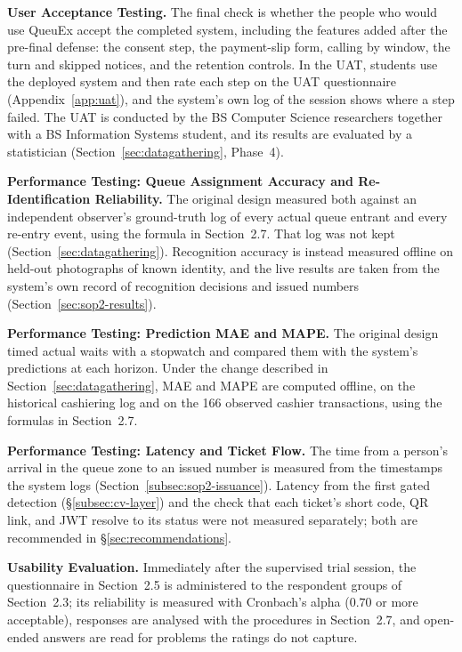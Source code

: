 \documentclass{research}
\newcommand{\sysname}{QueuEx}
\begin{document}
\textbf{User Acceptance Testing.} The final check is whether the people
who would use \sysname{} accept the completed system, including the
features added after the pre-final defense: the consent step, the
payment-slip form, calling by window, the turn and skipped notices, and
the retention controls. In the UAT, students use the deployed system
and then rate each step on the UAT questionnaire
(Appendix~\ref{app:uat}), and the system's own log of the session shows
where a step failed. The UAT is conducted by the BS Computer
Science researchers together with a BS Information Systems student, and
its results are evaluated by a
statistician (Section~\ref{sec:datagathering}, Phase~4).

\textbf{Performance Testing: Queue Assignment Accuracy and
Re-Identification Reliability.} The original design measured both
against an independent observer's ground-truth log of every
actual queue entrant and every re-entry event, using the formula in
Section~2.7. That log was not kept (Section~\ref{sec:datagathering}).
Recognition accuracy is instead measured offline on held-out
photographs of known identity, and the live results are taken from the
system's own record of recognition decisions and issued numbers
(Section~\ref{sec:sop2-results}).

\textbf{Performance Testing: Prediction MAE and MAPE.} The original
design timed actual waits with a stopwatch and compared them with the
system's predictions at each horizon. Under the change described in
Section~\ref{sec:datagathering}, MAE and MAPE are computed offline, on
the historical cashiering log and on the 166 observed cashier
transactions, using the formulas in Section~2.7.

\textbf{Performance Testing: Latency and Ticket Flow.} The time from a
person's arrival in the queue zone to an issued number is measured from
the timestamps the system logs (Section~\ref{subsec:sop2-issuance}).
Latency from the first gated detection (\S\ref{subsec:cv-layer}) and
the check that each ticket's short code, QR link, and JWT resolve to its
status were not measured separately; both are recommended in \S\ref{sec:recommendations}.

\textbf{Usability Evaluation.} Immediately after the supervised trial
session, the questionnaire in Section~2.5 is administered to the
respondent groups of Section~2.3; its reliability is measured with
Cronbach's alpha ($0.70$ or more acceptable), responses are analysed
with the procedures in Section~2.7, and open-ended answers are read for
problems the ratings do not capture.
\end{document}
